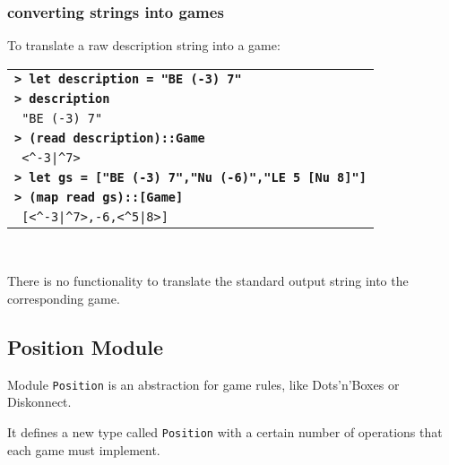 \documentclass[a4paper,12pt]{article}
\newcommand{\bash}[1]{\small\textbf{\lstinline§> #1§}\\}
\newcommand{\out}[1]{\small\lstinline§ #1§}
\newcommand{\haskellCode}{\fontfamily{pcr}\selectfont}
\newenvironment{sgcode}
	{ \haskellCode
	  \begin{tabular}{|p{0.9\textwidth}|}
      \hline	
	}
	{ \\\hline  
      \end{tabular} \\
	  \par 
	}
\begin{document}
%
%
%
%

\subsubsection{converting strings into games}

To translate a raw description string into a game:

\begin{sgcode}
\bash{let description = "BE (-3) 7"}
\bash{description}
\out{"BE (-3) 7"} \\
\bash{(read description)::Game}
\out{<^-3|^7>} \\
\bash{let gs = ["BE (-3) 7","Nu (-6)","LE 5 [Nu 8]"]}
\bash{(map read gs)::[Game]}
\out{[<^-3|^7>,-6,<^5|8>]} 
\end{sgcode}

There is no functionality to translate the standard output string into the
corresponding game.

\subsection{Position Module}

Module \verb|Position| is an abstraction for game rules, like Dots'n'Boxes or Diskonnect.

It defines a new type called \verb|Position| with a certain number of operations 
that each game must implement. 
\end{document}
